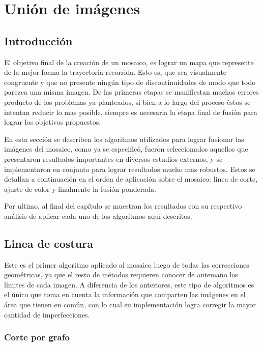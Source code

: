 \chapter{Unión de imágenes}
\label{capitulo5}


\section{Introducción}
El objetivo final de la creación de un mosaico, es lograr un mapa que represente de la mejor forma la trayectoria recorrida. Esto es, que sea visualmente congruente y que no presente ningún tipo de discontinuidades de modo que todo parezca una misma imagen. De las primeras etapas se manifiestan muchos errores producto de los problemas ya planteados, si bien a lo largo del proceso éstos se intentan reducir lo mas posible, siempre es necesaria la etapa final de fusión para lograr los objetivos propuestos.

En esta sección se describen los algoritmos utilizados para lograr fusionar las imágenes del mosaico, como ya se especificó, fueron seleccionados aquellos que presentaron resultados importantes en diversos estudios externos, y se implementaron en conjunto para lograr resultados mucho mas robustos. Estos se detallan a continuación en el orden de aplicación sobre el mosaico: linea de corte, ajuste de color y finalmente la fusión ponderada.

Por ultimo, al final del capítulo se muestran los resultados con su respectivo análisis de aplicar cada uno de los algoritmos aquí descritos.
\clearpage


\section{Linea de costura}

Este es el primer algoritmo aplicado al mosaico luego de todas las correcciones geométricas, ya que el resto de métodos requieren conocer de antemano los límites de cada imagen. 
A diferencia de los anteriores, este tipo de algoritmos es el único que toma en cuenta la información que comparten las imágenes en el área que tienen en común, con lo cual su implementación logra corregir la mayor cantidad de imperfecciones. 


\subsection{Corte por grafo}

